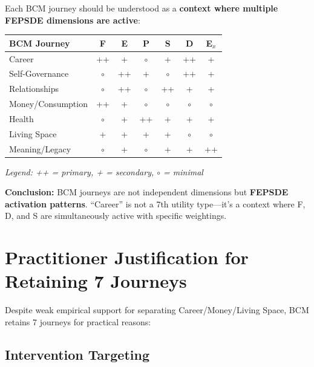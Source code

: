 Each BCM journey should be understood as a \textbf{context where multiple FEPSDE dimensions are active}:

\begin{center}
\small
\begin{tabular}{@{}lcccccc@{}}
\toprule
\textbf{BCM Journey} & \textbf{F} & \textbf{E} & \textbf{P} & \textbf{S} & \textbf{D} & \textbf{E$_x$} \\
\midrule
Career & ++ & + & $\circ$ & + & ++ & + \\
Self-Governance & $\circ$ & ++ & + & $\circ$ & ++ & + \\
Relationships & $\circ$ & ++ & $\circ$ & ++ & + & + \\
Money/Consumption & ++ & + & $\circ$ & $\circ$ & $\circ$ & $\circ$ \\
Health & $\circ$ & + & ++ & + & + & + \\
Living Space & + & + & + & + & $\circ$ & $\circ$ \\
Meaning/Legacy & $\circ$ & + & $\circ$ & + & + & ++ \\
\bottomrule
\end{tabular}
\end{center}

\textit{Legend: ++ = primary, + = secondary, $\circ$ = minimal}

\textbf{Conclusion:} BCM journeys are not independent dimensions but \textbf{FEPSDE activation patterns}. ``Career'' is not a 7th utility type---it's a context where F, D, and S are simultaneously active with specific weightings.


\section{Practitioner Justification for Retaining 7 Journeys}
\label{sec:bj-justification}

Despite weak empirical support for separating Career/Money/Living Space, BCM retains 7 journeys for practical reasons:

\subsection{Intervention Targeting}

